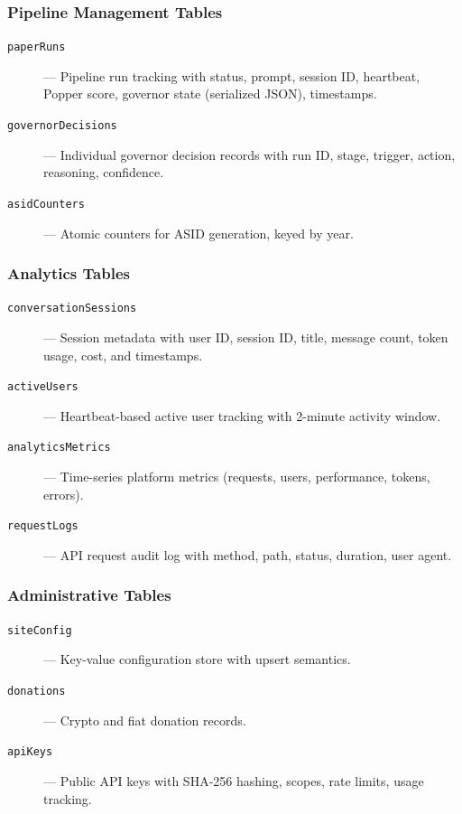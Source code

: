\subsubsection{Pipeline Management Tables}

\begin{description}
  \item[\texttt{paperRuns}] --- Pipeline run tracking with status, prompt, session ID, heartbeat, Popper score, governor state (serialized JSON), timestamps.
  \item[\texttt{governorDecisions}] --- Individual governor decision records with run ID, stage, trigger, action, reasoning, confidence.
  \item[\texttt{asidCounters}] --- Atomic counters for ASID generation, keyed by year.
\end{description}

\subsubsection{Analytics Tables}

\begin{description}
  \item[\texttt{conversationSessions}] --- Session metadata with user ID, session ID, title, message count, token usage, cost, and timestamps.
  \item[\texttt{activeUsers}] --- Heartbeat-based active user tracking with 2-minute activity window.
  \item[\texttt{analyticsMetrics}] --- Time-series platform metrics (requests, users, performance, tokens, errors).
  \item[\texttt{requestLogs}] --- API request audit log with method, path, status, duration, user agent.
\end{description}

\subsubsection{Administrative Tables}

\begin{description}
  \item[\texttt{siteConfig}] --- Key-value configuration store with upsert semantics.
  \item[\texttt{donations}] --- Crypto and fiat donation records.
  \item[\texttt{apiKeys}] --- Public API keys with SHA-256 hashing, scopes, rate limits, usage tracking.
\end{description}

